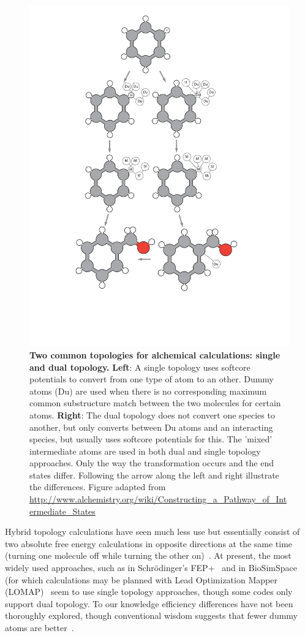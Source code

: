 \documentclass[9pt,bestpractices]{livecoms}
\begin{document}
\begin{figure}
    \includegraphics[width=0.95\columnwidth]{figures/fig3_topol/Figure.pdf}
    \caption{\textbf{Two common topologies for alchemical calculations: single and dual topology.} \textbf{Left}: A single topology uses softcore potentials to convert from one type of atom to an other. Dummy atoms (Du) are used when there is no corresponding maximum common substructure match between the two molecules for certain atoms. \textbf{Right}: The dual topology does not convert one species to another, but only converts between Du atoms and an interacting species, but usually uses softcore potentials for this. The 'mixed' intermediate atoms are used in both dual and single topology approaches. Only the way the transformation occurs and the end states differ. Following the arrow along the left and right illustrate the differences.  Figure adapted from \url{http://www.alchemistry.org/wiki/Constructing_a_Pathway_of_Intermediate_States}}
    \label{fig:fig_topology}
\end{figure} 
Hybrid topology calculations have seen much less use but essentially consist of two absolute free energy calculations in opposite directions at the same time (turning one molecule off while turning the other on)~\cite{jiang2019computing}.
At present, the most widely used approaches, such as in Schr\"{o}dinger's FEP+~\cite{wang2015accurate,wang2019protein} and in BioSimSpace~\cite{hedges2019biosimspace} (for which calculations may be planned with Lead Optimization Mapper (LOMAP)~\cite{liu2013lead} seem to use single topology approaches, though some codes only support dual topology.
To our knowledge efficiency differences have not been thoroughly explored, though conventional wisdom suggests that fewer dummy atoms are better~\cite{liu2013lead,mobley2012perspective}.
%
\end{document}
